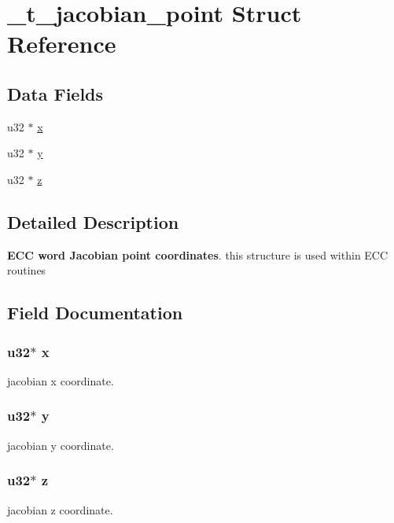 \hypertarget{struct__t__jacobian__point}{\section{\+\_\+t\+\_\+jacobian\+\_\+point Struct Reference}
\label{struct__t__jacobian__point}
}
\subsection*{Data Fields}
\begin{DoxyCompactItemize}
\item
u32 $\ast$ \hyperlink{struct__t__jacobian__point_afb22ef172fe0d1819b8a567bc4f9d0a8}{x}
\item
u32 $\ast$ \hyperlink{struct__t__jacobian__point_a7c48a39466ef1e0a5be106b297e920b5}{y}
\item
u32 $\ast$ \hyperlink{struct__t__jacobian__point_a48e8ffec6ab90e777406760e2dd11aa3}{z}
\end{DoxyCompactItemize}


\subsection{Detailed Description}
{\bfseries E\+C\+C word Jacobian point coordinates}. this structure is used within E\+C\+C routines

\subsection{Field Documentation}
\hypertarget{struct__t__jacobian__point_afb22ef172fe0d1819b8a567bc4f9d0a8}{
\subsubsection[{x}]{\setlength{\rightskip}{0pt plus 5cm}u32$\ast$ x}}\label{struct__t__jacobian__point_afb22ef172fe0d1819b8a567bc4f9d0a8}
jacobian x coordinate. \hypertarget{struct__t__jacobian__point_a7c48a39466ef1e0a5be106b297e920b5}{
\subsubsection[{y}]{\setlength{\rightskip}{0pt plus 5cm}u32$\ast$ y}}\label{struct__t__jacobian__point_a7c48a39466ef1e0a5be106b297e920b5}
jacobian y coordinate. \hypertarget{struct__t__jacobian__point_a48e8ffec6ab90e777406760e2dd11aa3}{
\subsubsection[{z}]{\setlength{\rightskip}{0pt plus 5cm}u32$\ast$ z}}\label{struct__t__jacobian__point_a48e8ffec6ab90e777406760e2dd11aa3}
jacobian z coordinate. 